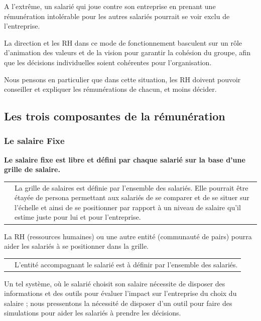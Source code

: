 \documentclass[12pt]{article}
\newcommand{\assemblee}[1]{%
  \begin{tcolorbox}[colframe=DarkPlum,boxrule=2pt,arc=4pt,left=6pt,right=6pt,top=6pt,bottom=6pt,boxsep=0pt,colback=white]
    \begin{tabular}{m{1cm} m{0.86\textwidth}}
      {\huge \faUsers} & #1 \\
    \end{tabular}
  \end{tcolorbox}
}
\newcommand{\regle}[1]{%
  \begin{tcolorbox}[colframe=DarkOrange,boxrule=2pt,arc=4pt,left=6pt,right=6pt,top=6pt,bottom=6pt,boxsep=0pt,colback=LightOrange]
  \textbf{#1}
  \end{tcolorbox}
}
\begin{document}
 A l'extrême, un salarié qui joue contre son entreprise en prenant une rémunération intolérable pour les autres salariés pourrait se voir exclu de l’entreprise. 

 La direction et les RH dans ce mode de fonctionnement basculent sur un rôle d’animation des valeurs et de la vision pour garantir la cohésion du groupe, afin que les décisions individuelles soient cohérentes pour l’organisation. 
 
 Nous pensons en particulier que dans cette situation, les RH doivent pouvoir conseiller et expliquer les rémunérations de chacun, et moins décider.

\subsection{Les trois composantes de la rémunération}
\subsubsection{Le salaire Fixe}

 \regle{Le salaire fixe est libre et défini par chaque salarié sur la base d’une grille de salaire. }

 \assemblee{La grille de salaires est définie par l’ensemble des salariés. Elle pourrait être étayée de persona permettant aux salariés de se comparer et de se situer sur l’échelle et ainsi de se positionner par rapport à un niveau de salaire qu’il estime juste pour lui et pour l’entreprise.}

 La RH (ressources humaines) ou une autre entité (communauté de pairs) pourra aider les salariés à se positionner dans la grille. 
 
 \assemblee{L'entité accompagnant le salarié est à définir par l'ensemble des salariés.}
 
 Un tel système, où le salarié choisit son salaire nécessite de disposer des informations et des outils pour évaluer l’impact sur l’entreprise du choix du salaire ; nous pressentons la nécessité de disposer d’un outil pour faire des simulations pour aider les salariés à prendre les décisions.
 
\end{document}
